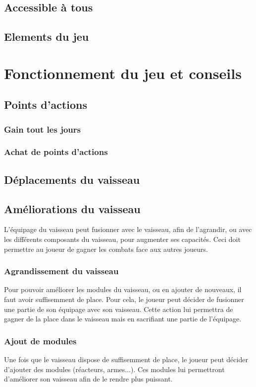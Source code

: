 \documentclass[a4paper,11pt]{report}
\begin{document}
  \section{Accessible à tous}
  \section{Elements du jeu}
\chapter{Fonctionnement du jeu et conseils}
  \section{Points d'actions}
    \subsection{Gain tout les jours}
    \subsection{Achat de points d'actions}
  \section{Déplacements du vaisseau}
  \section{Améliorations du vaisseau}
  L'équipage du vaisseau peut fusionner avec le vaisseau, afin de l'agrandir, ou avec les différents composants du vaisseau, pour augmenter ses capacités.
  Ceci doit permettre au joueur de gagner les combats face aux autres joueurs.
    \subsection{Agrandissement du vaisseau}
      Pour pouvoir améliorer les modules du vaisseau, ou en ajouter de nouveaux, il faut avoir suffisemment de place. 
      Pour cela, le joueur peut décider de fusionner une partie de son équipage avec son vaisseau. 
      Cette action lui permettra de gagner de la place dans le vaisseau mais en sacrifiant une partie de l'équipage.
      
    \subsection{Ajout de modules}
      Une fois que le vaisseau dispose de suffisemment de place, le joueur peut décider d'ajouter des modules (réacteurs, armes...). 
      Ces modules lui permettront d'améliorer son vaisseau afin de le rendre plus puissant.
          
\end{document}
